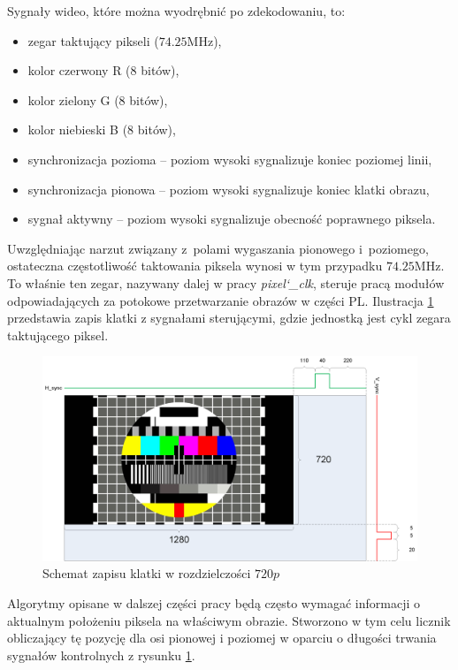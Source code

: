 Sygnały wideo, które można wyodrębnić po zdekodowaniu, to:
\begin{itemize}
	\item zegar taktujący pikseli ($74.25$MHz),
	\item kolor czerwony R (8 bitów),
	\item kolor zielony G (8 bitów),
	\item kolor niebieski B (8 bitów),
	\item synchronizacja pozioma -- poziom wysoki sygnalizuje koniec poziomej linii,
	\item synchronizacja pionowa -- poziom wysoki sygnalizuje koniec klatki obrazu,
	\item sygnał aktywny -- poziom wysoki sygnalizuje obecność poprawnego piksela.
\end{itemize}

Uwzględniając narzut związany z~polami wygaszania pionowego i~poziomego, ostateczna częstotliwość taktowania piksela wynosi w tym przypadku $74.25$MHz. 
To właśnie ten zegar, nazywany dalej w pracy \textit{\boldmath pixel\char`_clk}, steruje pracą modułów odpowiadających za potokowe przetwarzanie obrazów w części PL.
Ilustracja \ref{fig:720_frame} przedstawia zapis klatki z sygnałami sterującymi, gdzie jednostką jest cykl zegara taktującego piksel. %

\begin{figure}[h]
	\centering
	\includegraphics[width=17cm]{4_720p.png}
	\caption{Schemat zapisu klatki w rozdzielczości $720p$}
	\label{fig:720_frame}
\end{figure}

Algorytmy opisane w dalszej części pracy będą często wymagać informacji o aktualnym położeniu piksela na właściwym obrazie. %
Stworzono w tym celu licznik obliczający tę pozycję dla osi pionowej i poziomej w oparciu o długości trwania sygnałów kontrolnych z rysunku \ref{fig:720_frame}. 

